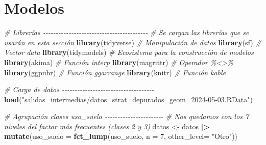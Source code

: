 \documentclass[12pt,a4paper,]{book}
\newenvironment{Shaded}{\begin{snugshade}}{\end{snugshade}}
\newcommand{\AttributeTok}[1]{\textcolor[rgb]{0.13,0.29,0.53}{#1}}
\newcommand{\CommentTok}[1]{\textcolor[rgb]{0.56,0.35,0.01}{\textit{#1}}}
\newcommand{\DecValTok}[1]{\textcolor[rgb]{0.00,0.00,0.81}{#1}}
\newcommand{\FunctionTok}[1]{\textcolor[rgb]{0.13,0.29,0.53}{\textbf{#1}}}
\newcommand{\NormalTok}[1]{#1}
\newcommand{\OtherTok}[1]{\textcolor[rgb]{0.56,0.35,0.01}{#1}}
\newcommand{\SpecialCharTok}[1]{\textcolor[rgb]{0.81,0.36,0.00}{\textbf{#1}}}
\newcommand{\StringTok}[1]{\textcolor[rgb]{0.31,0.60,0.02}{#1}}
\numberwithin{dummy}{section}
\theoremstyle{ocrenumbox}
\theoremstyle{blacknumex}
\theoremstyle{blacknumbox}
\theoremstyle{ocrenum}
\theoremstyle{ocrenum}
\begin{document}
\hypertarget{modelos-1}{%
\section{Modelos}\label{modelos-1}}

\begin{Shaded}
\begin{Highlighting}[]
\CommentTok{\# Librerías {-}{-}{-}{-}{-}{-}{-}{-}{-}{-}{-}{-}{-}{-}{-}{-}{-}{-}{-}{-}{-}{-}{-}{-}{-}{-}{-}{-}{-}{-}{-}{-}{-}{-}{-}{-}{-}{-}{-}{-}{-}}
\CommentTok{\# Se cargan las librerías que se usarán en esta sección}
\FunctionTok{library}\NormalTok{(tidyverse) }\CommentTok{\# Manipulación de datos }
\FunctionTok{library}\NormalTok{(sf) }\CommentTok{\# Vector data}
\FunctionTok{library}\NormalTok{(tidymodels) }\CommentTok{\# Ecosistema para la construcción de modelos}
\FunctionTok{library}\NormalTok{(akima) }\CommentTok{\# Función interp}
\FunctionTok{library}\NormalTok{(magrittr) }\CommentTok{\# Operador \%\textless{}\textgreater{}\% }
\FunctionTok{library}\NormalTok{(ggpubr) }\CommentTok{\# Función ggarrange}
\FunctionTok{library}\NormalTok{(knitr) }\CommentTok{\# Función kable}

\CommentTok{\# Carga de datos {-}{-}{-}{-}{-}{-}{-}{-}{-}{-}{-}{-}{-}{-}{-}{-}{-}{-}{-}{-}{-}{-}{-}{-}{-}{-}{-}{-}{-}{-}{-}{-}{-}{-}{-}{-} }
\FunctionTok{load}\NormalTok{(}\StringTok{"salidas\_intermedias/datos\_strat\_depurados\_geom\_2024{-}05{-}03.RData"}\NormalTok{)}

\CommentTok{\# Agrupación clases uso\_suelo {-}{-}{-}{-}{-}{-}{-}{-}{-}{-}{-}{-}{-}{-}{-}{-}{-}{-}{-}{-}{-}{-}{-}}
\CommentTok{\# Nos quedamos con los 7 niveles del factor más frecuentes (clases 2 y 3)}
\NormalTok{datos }\OtherTok{\textless{}{-}}\NormalTok{ datos }\SpecialCharTok{|\textgreater{}} 
  \FunctionTok{mutate}\NormalTok{(}\AttributeTok{uso\_suelo =} \FunctionTok{fct\_lump}\NormalTok{(uso\_suelo,}
                              \AttributeTok{n =} \DecValTok{7}\NormalTok{,}
                              \AttributeTok{other\_level=} \StringTok{"Otro"}\NormalTok{))}


\end{Highlighting}
\end{Shaded}
\end{document}
